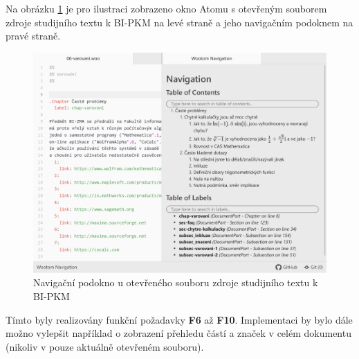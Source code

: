 Na obrázku \ref{navigace-pkm} je pro ilustraci zobrazeno okno Atomu s otevřeným souborem zdroje studijního textu k
BI-PKM na levé straně a jeho navigačním podoknem na pravé straně.

\begin{figure}\centering
    \includegraphics[width=1.0\textwidth]{content/realizace/navigace-pkm}
 	\caption[Navigace v dokumentu]{Navigační podokno u otevřeného souboru zdroje studijního textu k BI-PKM \cite{pkm}}
    \label{navigace-pkm}
\end{figure}

Tímto byly realizovány funkční požadavky \textbf{F6} až \textbf{F10}. Implementaci by bylo dále možno vylepšit například
o zobrazení přehledu částí a značek v celém dokumentu (nikoliv v pouze aktuálně otevřeném souboru).
